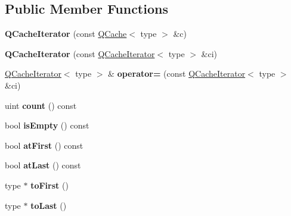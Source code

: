 \subsection*{Public Member Functions}
\begin{DoxyCompactItemize}
\item 
\mbox{\label{class_q_cache_iterator_a8ce66f9d4184d0013ea7a59674080d67}} 
{\bfseries Q\+Cache\+Iterator} (const \mbox{\hyperlink{class_q_cache}{Q\+Cache}}$<$ type $>$ \&c)
\item 
\mbox{\label{class_q_cache_iterator_aa94183546e51c5e0a844258e3059528e}} 
{\bfseries Q\+Cache\+Iterator} (const \mbox{\hyperlink{class_q_cache_iterator}{Q\+Cache\+Iterator}}$<$ type $>$ \&ci)
\item 
\mbox{\label{class_q_cache_iterator_abfb5a979564b4e1e5bdc63f960d40774}} 
\mbox{\hyperlink{class_q_cache_iterator}{Q\+Cache\+Iterator}}$<$ type $>$ \& {\bfseries operator=} (const \mbox{\hyperlink{class_q_cache_iterator}{Q\+Cache\+Iterator}}$<$ type $>$ \&ci)
\item 
\mbox{\label{class_q_cache_iterator_a62cc1fbd751ce7c718ef4e94983708ce}} 
uint {\bfseries count} () const
\item 
\mbox{\label{class_q_cache_iterator_a437fb6001c31219289617a4c0c016bb1}} 
bool {\bfseries is\+Empty} () const
\item 
\mbox{\label{class_q_cache_iterator_aeb087cf877558880adaeab93ae094910}} 
bool {\bfseries at\+First} () const
\item 
\mbox{\label{class_q_cache_iterator_a1311d5f8cb3f502d8980c402b6c25def}} 
bool {\bfseries at\+Last} () const
\item 
\mbox{\label{class_q_cache_iterator_acae7f57008d32c333d9d0ea6e5630434}} 
type $\ast$ {\bfseries to\+First} ()
\item 
\mbox{\label{class_q_cache_iterator_aa6c84065b43a3c73fbaeb9ae98016156}} 
type $\ast$ {\bfseries to\+Last} ()
\item 

\end{DoxyCompactItemize}
